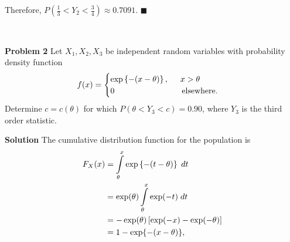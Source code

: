 \documentclass{article}
\newcommand{\mybox}{%
    \collectbox{%
        \setlength{\fboxsep}{1pt}%
        \fbox{\BOXCONTENT}%
    }%
}
\begin{document}
\noindent Therefore, $P\left(\frac{1}{3} < Y_2 < \frac{3}{4}\right) \approx 0.7091.$ \hfill$\blacksquare$

\begin{center}
\vspace{-0.4cm}
\hrulefill \\
\vspace{-0.7cm}
\hrulefill
\end{center}

\vspace{3mm}

\noindent\mybox{\textbf{Problem 2}} \hspace{3mm} Let $X_1, X_2, X_3$ be independent random variables with probability density function 
$$
f(x) = 
\begin{cases}
\exp\left\lbrace-(x-\theta)\right\rbrace, \hspace{5mm} x > \theta \\
0 \hspace{29mm} \text{elsewhere.}
\end{cases}
$$
\noindent Determine $c=c(\theta)$ for which $P(\theta < Y_3 < c) = 0.90$, where $Y_3$ is the third order statistic.  

\vspace{5mm}

\noindent\mybox{\textbf{Solution}} \hspace{3mm} The cumulative distribution function for the population is 
\begin{align}
F_X(x) &= \int\limits_{\theta}^{x}\exp\left\lbrace-(t-\theta)\right\rbrace \hspace{1mm} dt \\
&= \exp(\theta)\int\limits_{\theta}^{x}\exp(-t) \hspace{1mm} dt \\
&= -\exp(\theta)\left[\exp(-x) - \exp(-\theta)\right] \\
&= 1 - \exp\lbrace-(x - \theta)\rbrace,
\end{align}
\end{document}
